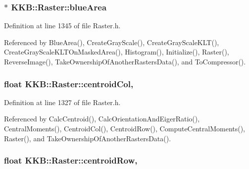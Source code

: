 \subsubsection[{\texorpdfstring{blue\+Area}{blueArea}}]{$\ast$ K\+K\+B\+::\+Raster\+::blue\+Area\hspace{0.3cm}{\ttfamily [protected]}}\hypertarget{class_k_k_b_1_1_raster_af7996dfe61613e5ecf91454175bfe3f1}{}\label{class_k_k_b_1_1_raster_af7996dfe61613e5ecf91454175bfe3f1}


Definition at line 1345 of file Raster.\+h.



Referenced by Blue\+Area(), Create\+Gray\+Scale(), Create\+Gray\+Scale\+K\+L\+T(), Create\+Gray\+Scale\+K\+L\+T\+On\+Masked\+Area(), Histogram(), Initialize(), Raster(), Reverse\+Image(), Take\+Ownership\+Of\+Another\+Rasters\+Data(), and To\+Compressor().

\subsubsection[{\texorpdfstring{centroid\+Col}{centroidCol}}]{\setlength{\rightskip}{0pt plus 5cm}float K\+K\+B\+::\+Raster\+::centroid\+Col\hspace{0.3cm}{\ttfamily [mutable]}, {\ttfamily [protected]}}\hypertarget{class_k_k_b_1_1_raster_ac4cb3984d20f6eef6fd4f201681ea1d5}{}\label{class_k_k_b_1_1_raster_ac4cb3984d20f6eef6fd4f201681ea1d5}


Definition at line 1327 of file Raster.\+h.



Referenced by Calc\+Centroid(), Calc\+Orientation\+And\+Eiger\+Ratio(), Central\+Moments(), Centroid\+Col(), Centroid\+Row(), Compute\+Central\+Moments(), Raster(), and Take\+Ownership\+Of\+Another\+Rasters\+Data().

\subsubsection[{\texorpdfstring{centroid\+Row}{centroidRow}}]{\setlength{\rightskip}{0pt plus 5cm}float K\+K\+B\+::\+Raster\+::centroid\+Row\hspace{0.3cm}{\ttfamily [mutable]}, {\ttfamily [protected]}}\hypertarget{class_k_k_b_1_1_raster_a3380e5734ec57a147e36c734cc83c5ff}{}\label{class_k_k_b_1_1_raster_a3380e5734ec57a147e36c734cc83c5ff}


